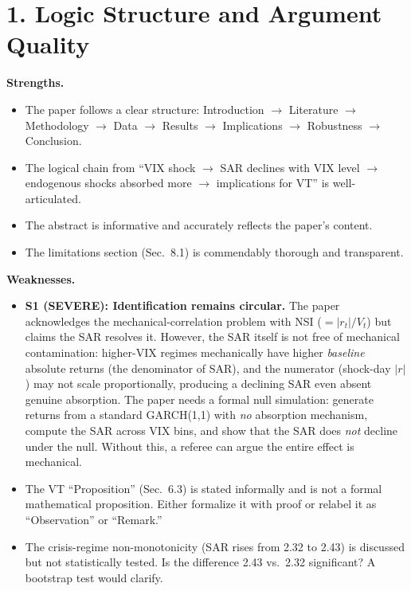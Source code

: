\documentclass[12pt,a4paper]{article}
\begin{document}
\section*{1. Logic Structure and Argument Quality}

\textbf{Strengths.}
\begin{itemize}[nosep]
  \item The paper follows a clear structure: Introduction $\to$ Literature $\to$ Methodology $\to$ Data $\to$ Results $\to$ Implications $\to$ Robustness $\to$ Conclusion.
  \item The logical chain from ``VIX shock $\to$ SAR declines with VIX level $\to$ endogenous shocks absorbed more $\to$ implications for VT'' is well-articulated.
  \item The abstract is informative and accurately reflects the paper's content.
  \item The limitations section (Sec.~8.1) is commendably thorough and transparent.
\end{itemize}

\textbf{Weaknesses.}
\begin{itemize}[nosep]
  \item \textcolor{errorred}{\textbf{S1 (SEVERE): Identification remains circular.}} The paper acknowledges the mechanical-correlation problem with NSI ($= |r_t|/V_t$) but claims the SAR resolves it.  However, the SAR itself is not free of mechanical contamination: higher-VIX regimes mechanically have higher \emph{baseline} absolute returns (the denominator of SAR), and the numerator (shock-day $|r|$) may not scale proportionally, producing a declining SAR even absent genuine absorption.  The paper needs a formal null simulation: generate returns from a standard GARCH(1,1) with \emph{no} absorption mechanism, compute the SAR across VIX bins, and show that the SAR does \emph{not} decline under the null.  Without this, a referee can argue the entire effect is mechanical.
  \item The VT ``Proposition'' (Sec.~6.3) is stated informally and is not a formal mathematical proposition.  Either formalize it with proof or relabel it as ``Observation'' or ``Remark.''
  \item The crisis-regime non-monotonicity (SAR rises from 2.32 to 2.43) is discussed but not statistically tested.  Is the difference 2.43 vs.\ 2.32 significant?  A bootstrap test would clarify.
\end{itemize}
\end{document}
